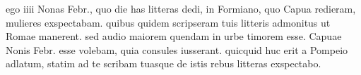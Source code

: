  ego iiii Nonas Febr., quo die has litteras dedi, in Formiano, quo Capua redieram, mulieres exspectabam. quibus quidem scripseram tuis litteris admonitus ut Romae manerent. sed audio maiorem quendam in urbe timorem esse. Capuae Nonis Febr. esse volebam, quia consules iusserant. quicquid huc erit a Pompeio adlatum, statim ad te scribam tuasque de istis rebus litteras exspectabo.

